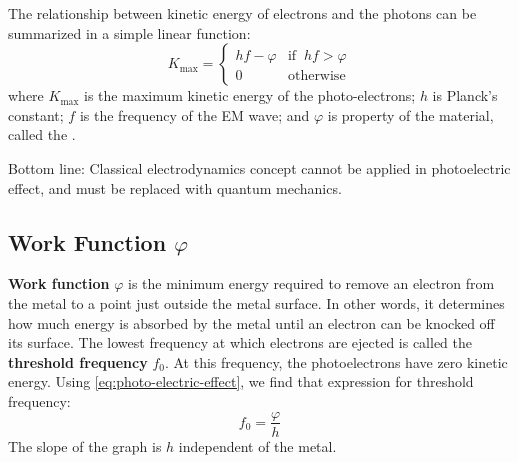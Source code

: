 The relationship between kinetic energy of electrons and the photons can be
summarized in a simple linear function:
\begin{equation}
  \boxed{
    K_\text{max}=
    \begin{cases}
      hf-\varphi & \text{if}\;\;hf>\varphi\\
      0          & \text{otherwise}
    \end{cases}
  }
  \label{eq:photo-electric-effect}
\end{equation}
where $K_\text{max}$ is the maximum kinetic energy of the photo-electrons; $h$
is Planck's constant; $f$ is the frequency of the EM wave; and $\varphi$ is
property of the material, called the .



Bottom line: Classical electrodynamics concept cannot
be applied in photoelectric effect, and must be replaced with quantum
mechanics.




\subsection{Work Function $\varphi$}

\textbf{Work function} $\varphi$ is the minimum energy required to remove an
electron from the metal to a point just outside the metal surface. In other
words, it determines how much energy is absorbed by the metal until an electron
can be knocked off its surface. The lowest frequency at which electrons are
ejected is called the \textbf{threshold frequency} $f_0$. At this frequency,
the photoelectrons have zero kinetic energy. Using
\ref{eq:photo-electric-effect}, we find that expression for threshold
frequency:
\begin{equation}
  \boxed{
    f_0=\frac{\varphi}h
  }
\end{equation}
The slope of the graph is $h$ independent of the metal.

